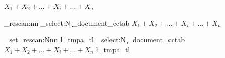 \documentclass{article}
\begin{document}
\ExplSyntaxOn
{ $X_1 + X_2 + \dots + X_i  + \dots + X_n$ } \par
\tl_rescan:nn  
  { \cctab_select:N \c_document_cctab }
  { $X_1 + X_2 + \dots + X_i  + \dots + X_n$ } \par
\tl_set_rescan:Nnn \l_tmpa_tl  
  { \cctab_select:N \c_document_cctab }
  { $X_1 + X_2 + \dots + X_i  + \dots + X_n $ } 
\l_tmpa_tl \par
\ExplSyntaxOff
\end{document}
